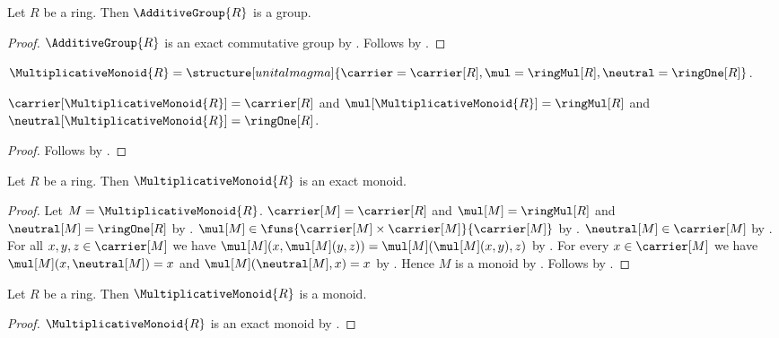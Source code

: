 \begin{classification}\label{additive_group_is_group}
    Let $R$ be a ring.
    Then $\AdditiveGroup{R}$ is a group.
\end{classification}
\begin{proof}
    $\AdditiveGroup{R}$ is an exact commutative group by
        .
    Follows by .
\end{proof}

\begin{definition}\label{multiplicative_monoid}
    $\MultiplicativeMonoid{R}=
        \structure[unital magma]{
            \carrier=\carrier[R],
            \mul=\ringMul[R],
            \neutral=\ringOne[R]
        }$.
\end{definition}

\begin{proposition}\label{multiplicative_monoid_fields}
    $\carrier[\MultiplicativeMonoid{R}]=\carrier[R]$ and
    $\mul[\MultiplicativeMonoid{R}]=\ringMul[R]$ and
    $\neutral[\MultiplicativeMonoid{R}]=\ringOne[R]$.
\end{proposition}
\begin{proof}
    Follows by
        .
\end{proof}

\begin{theorem}\label{multiplicative_monoid_is_exact_monoid}
    Let $R$ be a ring.
    Then $\MultiplicativeMonoid{R}$ is an exact monoid.
\end{theorem}
\begin{proof}
    Let $M=\MultiplicativeMonoid{R}$.
    $\carrier[M]=\carrier[R]$ and $\mul[M]=\ringMul[R]$ and
        $\neutral[M]=\ringOne[R]$ by
        .
    $\mul[M]\in\funs{\carrier[M]\times\carrier[M]}{\carrier[M]}$ by
        .
    $\neutral[M]\in\carrier[M]$ by .
    For all $x,y,z\in\carrier[M]$ we have
        $\mul[M](x,\mul[M](y,z))=\mul[M](\mul[M](x,y),z)$ by
        .
    For every $x\in\carrier[M]$ we have
        $\mul[M](x,\neutral[M])=x$ and
        $\mul[M](\neutral[M],x)=x$ by
        .
    Hence $M$ is a monoid by
        .
    Follows by
        .
\end{proof}

\begin{classification}\label{multiplicative_monoid_is_monoid}
    Let $R$ be a ring.
    Then $\MultiplicativeMonoid{R}$ is a monoid.
\end{classification}
\begin{proof}
    $\MultiplicativeMonoid{R}$ is an exact monoid by
        .
\end{proof}
